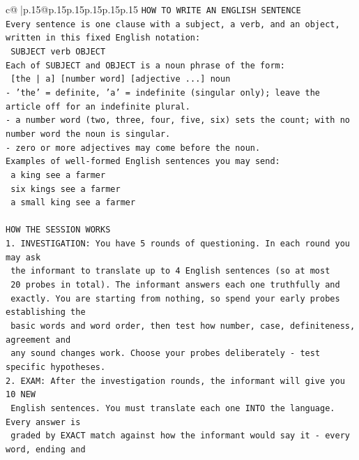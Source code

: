\documentclass{article}
\begin{document}
{\begin{supertabular}{c@{$\;$}|p{.15\linewidth}@{}p{.15\linewidth}p{.15\linewidth}p{.15\linewidth}p{.15\linewidth}p{.15\linewidth}}
{{{\texttt{HOW TO WRITE AN ENGLISH SENTENCE} \\
\texttt{Every sentence is one clause with a subject, a verb, and an object, written in this fixed English notation:} \\
\texttt{    SUBJECT  verb  OBJECT} \\
\texttt{Each of SUBJECT and OBJECT is a noun phrase of the form:} \\
\texttt{    {[}the | a{]}  {[}number word{]}  {[}adjective ...{]}  noun} \\
\texttt{{-} 'the' = definite, 'a' = indefinite (singular only); leave the article off for an indefinite plural.} \\
\texttt{{-} a number word (two, three, four, five, six) sets the count; with no number word the noun is singular.} \\
\texttt{{-} zero or more adjectives may come before the noun.} \\
\texttt{Examples of well{-}formed English sentences you may send:} \\
\texttt{    a king see a farmer} \\
\texttt{    six kings see a farmer} \\
\texttt{    a small king see a farmer} \\
\\ 
\texttt{HOW THE SESSION WORKS} \\
\texttt{1. INVESTIGATION: You have 5 rounds of questioning. In each round you may ask} \\
\texttt{   the informant to translate up to 4 English sentences (so at most} \\
\texttt{   20 probes in total). The informant answers each one truthfully and} \\
\texttt{   exactly. You are starting from nothing, so spend your early probes establishing the} \\
\texttt{   basic words and word order, then test how number, case, definiteness, agreement and} \\
\texttt{   any sound changes work. Choose your probes deliberately {-} test specific hypotheses.} \\
\texttt{2. EXAM: After the investigation rounds, the informant will give you 10 NEW} \\
\texttt{   English sentences. You must translate each one INTO the language. Every answer is} \\
\texttt{   graded by EXACT match against how the informant would say it {-} every word, ending and} \\
}}}
\end{supertabular}}
\end{document}
